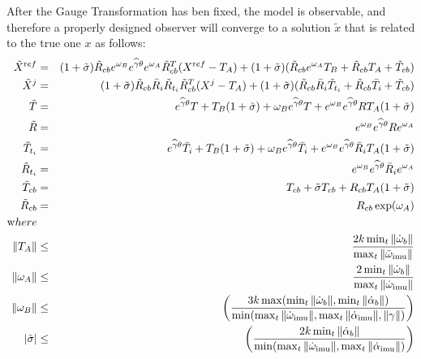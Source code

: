 After the Gauge Transformation has ben fixed, the model is observable, and therefore a properly designed observer will converge to a solution $\tilde x$ that is related to the true one $x$ as follows: 
\begin{eqnarray}
{\Xw}^{\mathrm ref} &=&   (1+\tilde  \sigma)\tilde R_{cb} e^{\w_B} e^{\widehat \gamma \theta}e^{\w_A} \tilde R_{cb}^T (X^{\mathrm ref}-T_A) +(1+\tilde \sigma)( \tilde R_{cb} e^{\w_A}T_B + \tilde R_{cb} T_A + \tilde T_{cb})  \\
{\Xw}^j &=&   (1+\tilde  \sigma)\tilde R_{cb} \bar R_i \tilde R_{t_i}  \tilde R_{cb}^T (X^{j}-T_A) +(1+\tilde \sigma)( \tilde R_{cb} \bar R_i \tilde T_{t_i} + \tilde R_{cb} \bar T_{i} + \tilde T_{cb}) \\
\tilde T %
&=& e^{\widehat \gamma \theta} T + T_B (1+\tilde\sigma) + \w_Be^{\widehat \gamma \theta} T + e^{\w_B} e^{\widehat \gamma \theta}R T_A(1+\tilde \sigma) \\
\tilde R &=&  e^{\w_B}e^{\widehat \gamma \theta} R e^{\w_A}\\
\tilde T_{t_i} &=&  e^{\widehat \gamma \theta} \bar T_{i} + T_B (1+\tilde\sigma) + \w_Be^{\widehat \gamma \theta} \bar T_{i} + e^{\w_B} e^{\widehat \gamma \theta}\bar R_{i} T_A(1+\tilde \sigma)\\
\tilde R_{t_i} &=&  e^{\w_B}e^{\widehat \gamma \theta} \bar R_{i} e^{\w_A}\\
\tilde T_{cb} &=&  T_{cb} + \tilde \sigma T_{cb} + R_{cb}T_A(1+ \tilde \sigma) \\
\tilde R_{cb} &=&  R_{cb}\exp(\w_A)\\
{\mathrm where} & &  \nonumber \\
\| T_A \| &\le& \frac{2 k \min_t \| \dot \w_b \| }{\max_t \| \ddot \w\imu  \|}  \nonumber \\
\| \w_A \| &\le& \frac{2 \min_t \| \dot \w_b \|}{\max_t \| \dot \w\imu  \|} \nonumber  \\
 \| \w_B \| &\le& \left(\frac{3k\max(\min_t \|\dot \w_b\|, \min_t \|\dot \alpha_b\| )}{\min(\max_t \| \dot \w\imu  \|, \max_t \| \dot \alpha\imu  \|, \| \gamma \|)}\right) \nonumber \\
| \tilde \sigma | &\le& \left(\frac{2k\min_t \| \dot \alpha_b \|}{\min(\max_t \| \dot \w\imu  \|, \max_t \| \dot \alpha\imu  \|)}\right) \nonumber
\end{eqnarray}
